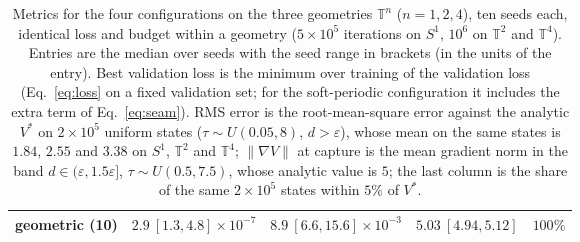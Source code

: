 \begin{table}[!tbp]
\begin{tabular}{lcccc}
geometric (10) & $2.9\ [1.3,4.8]\times10^{-7}$ & $8.9\ [6.6,15.6]\times10^{-3}$ & $5.03\ [4.94,5.12]$ & $100\%$ \\
\bottomrule
\end{tabular}
\caption{Metrics for the four configurations on the three geometries
$\mathbb{T}^{n}$ ($n = 1, 2, 4$), ten seeds each, identical loss and budget
within a geometry ($5\times10^{5}$ iterations on $S^{1}$, $10^{6}$ on
$\mathbb{T}^{2}$ and $\mathbb{T}^{4}$).  Entries are the median over seeds
with the seed range in brackets (in the units of the entry).  Best validation
loss is the minimum over training of the validation loss (Eq.~\eqref{eq:loss}
on a fixed validation set; for the soft-periodic configuration it includes
the extra term of Eq.~\eqref{eq:seam}).  RMS error is the root-mean-square
error against the analytic $V^{*}$ on $2\times10^{5}$ uniform states
($\tau \sim U(0.05, 8)$, $d > \varepsilon$), whose mean on the same states is
$1.84$, $2.55$ and $3.38$ on $S^{1}$, $\mathbb{T}^{2}$ and $\mathbb{T}^{4}$;
$\|\nabla V\|$ at capture is the mean gradient norm in the band
$d \in (\varepsilon, 1.5\varepsilon]$, $\tau \sim U(0.5, 7.5)$, whose analytic
value is $5$; the last column is the share of the same $2\times10^{5}$ states
within $5\%$ of $V^{*}$.}
\label{tab:campaign}
\end{table}

